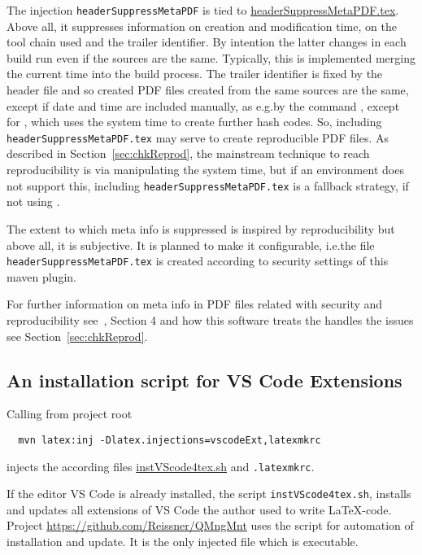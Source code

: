 The injection \texttt{headerSuppressMetaPDF} 
is tied to \href{\urlSite fromTex/headerSuppressMetaPDF.tex}{headerSuppressMetaPDF.tex}. 
Above all, it suppresses information on creation and modification time, on the tool chain used 
and the trailer identifier. 
By intention the latter changes in each build run even if the sources are the same. 
Typically, this is implemented merging the current time into the build process. 
The trailer identifier is fixed by the header file 
and so created PDF files created from the same sources are the same, 
except if date and time are included manually, as e.g.\@ by the command , 
except for \xelatex, which uses the system time to create further hash codes. 
So, including \texttt{headerSuppressMetaPDF.tex} may serve to create reproducible PDF files. 
As described in Section~\ref{sec:chkReprod}, 
the mainstream technique to reach reproducibility 
is via manipulating the system time, 
but if an environment does not support this, 
including \texttt{headerSuppressMetaPDF.tex} is a fallback strategy, 
if not using \xelatex. 

The extent to which meta info is suppressed is inspired by reproducibility 
but above all, it is subjective. 
It is planned to make it configurable, 
i.e.\@ the file \texttt{headerSuppressMetaPDF.tex} 
is created according to security settings of this maven plugin. 

For further information on meta info in PDF files 
related with security and reproducibility 
see~\cite{LatexGen}, Section 4 
and how this software treats the handles the issues 
see Section~\ref{sec:chkReprod}. 


\subsection{An installation script for VS Code Extensions }\label{subsec:instExtVsCode}

Calling from project root 
%
\begin{Verbatim}
  mvn latex:inj -Dlatex.injections=vscodeExt,latexmkrc
\end{Verbatim}
%
injects the according files \href{\urlSite fromMain/instVScode4tex}{instVScode4tex.sh} and \texttt{.latexmkrc}. 

If the editor VS Code is already installed, 
the script \texttt{instVScode4tex.sh}, 
installs and updates all extensions of VS Code the author used to write \LaTeX-code. 
Project \url{https://github.com/Reissner/QMngMnt} 
uses the script for automation of installation and update. 
It is the only injected file which is executable. 

